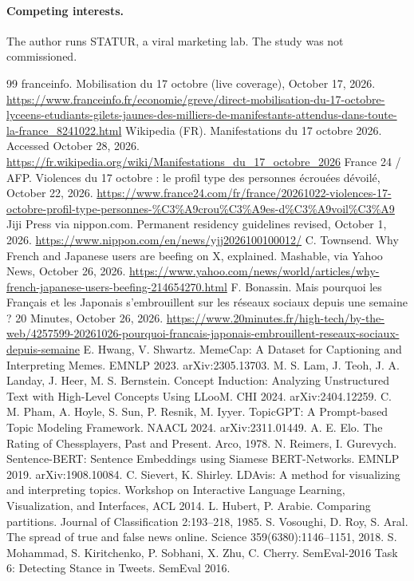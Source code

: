 \documentclass[10pt,a4paper]{article}
\begin{document}
\paragraph{Competing interests.} The author runs STATUR, a viral marketing lab. The study was not commissioned.

\begin{thebibliography}{99}\small
{} franceinfo. Mobilisation du 17 octobre (live coverage), October 17, 2026. \url{https://www.franceinfo.fr/economie/greve/direct-mobilisation-du-17-octobre-lyceens-etudiants-gilets-jaunes-des-milliers-de-manifestants-attendus-dans-toute-la-france_8241022.html}
 Wikipedia (FR). Manifestations du 17 octobre 2026. Accessed October 28, 2026. \url{https://fr.wikipedia.org/wiki/Manifestations_du_17_octobre_2026}
 France 24 / AFP. Violences du 17 octobre : le profil type des personnes \'ecrou\'ees d\'evoil\'e, October 22, 2026. \url{https://www.france24.com/fr/france/20261022-violences-17-octobre-profil-type-personnes-\%C3\%A9crou\%C3\%A9es-d\%C3\%A9voil\%C3\%A9}
 Jiji Press via nippon.com. Permanent residency guidelines revised, October 1, 2026. \url{https://www.nippon.com/en/news/yjj2026100100012/}
 C. Townsend. Why French and Japanese users are beefing on X, explained. Mashable, via Yahoo News, October 26, 2026. \url{https://www.yahoo.com/news/world/articles/why-french-japanese-users-beefing-214654270.html}
 F. Bonassin. Mais pourquoi les Fran\c{c}ais et les Japonais s'embrouillent sur les r\'eseaux sociaux depuis une semaine ? 20 Minutes, October 26, 2026. \url{https://www.20minutes.fr/high-tech/by-the-web/4257599-20261026-pourquoi-francais-japonais-embrouillent-reseaux-sociaux-depuis-semaine}
 E. Hwang, V. Shwartz. MemeCap: A Dataset for Captioning and Interpreting Memes. EMNLP 2023. arXiv:2305.13703.
 M. S. Lam, J. Teoh, J. A. Landay, J. Heer, M. S. Bernstein. Concept Induction: Analyzing Unstructured Text with High-Level Concepts Using LLooM. CHI 2024. arXiv:2404.12259.
 C. M. Pham, A. Hoyle, S. Sun, P. Resnik, M. Iyyer. TopicGPT: A Prompt-based Topic Modeling Framework. NAACL 2024. arXiv:2311.01449.
 A. E. Elo. The Rating of Chessplayers, Past and Present. Arco, 1978.
 N. Reimers, I. Gurevych. Sentence-BERT: Sentence Embeddings using Siamese BERT-Networks. EMNLP 2019. arXiv:1908.10084.
 C. Sievert, K. Shirley. LDAvis: A method for visualizing and interpreting topics. Workshop on Interactive Language Learning, Visualization, and Interfaces, ACL 2014.
 L. Hubert, P. Arabie. Comparing partitions. Journal of Classification 2:193--218, 1985.
 S. Vosoughi, D. Roy, S. Aral. The spread of true and false news online. Science 359(6380):1146--1151, 2018.
 S. Mohammad, S. Kiritchenko, P. Sobhani, X. Zhu, C. Cherry. SemEval-2016 Task 6: Detecting Stance in Tweets. SemEval 2016.
\end{thebibliography}
\end{document}
